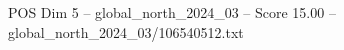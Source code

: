 \begin{textsample}{POS Dim 5 – global\_north\_2024\_03 – Score 15.00 – global\_north\_2024\_03/106540512.txt}
\end{textsample}
